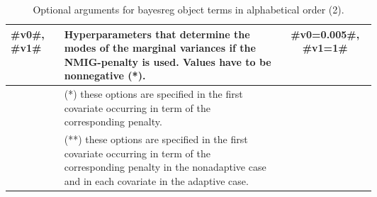 \begin{table}[ht]
\begin{tabular}{|l|p{0.6\linewidth}|c|}
#v0#, #v1#
& Hyperparameters that determine the modes of the marginal variances if the NMIG-penalty is used. Values
  have to be nonnegative (*).
& #v0=0.005#, #v1=1# \\
\hline




\hline
& (*) these options are specified in the first covariate occurring in term of
  the corresponding penalty.
& \\
& (**) these options are specified in the first covariate occurring in term of
  the corresponding penalty in the nonadaptive case and in each covariate in the
  adaptive case.
& \\
\hline




\end{tabular}
{\em\caption{\label{options2} Optional arguments for bayesreg
object terms in alphabetical order (2).}}
\end{table}


